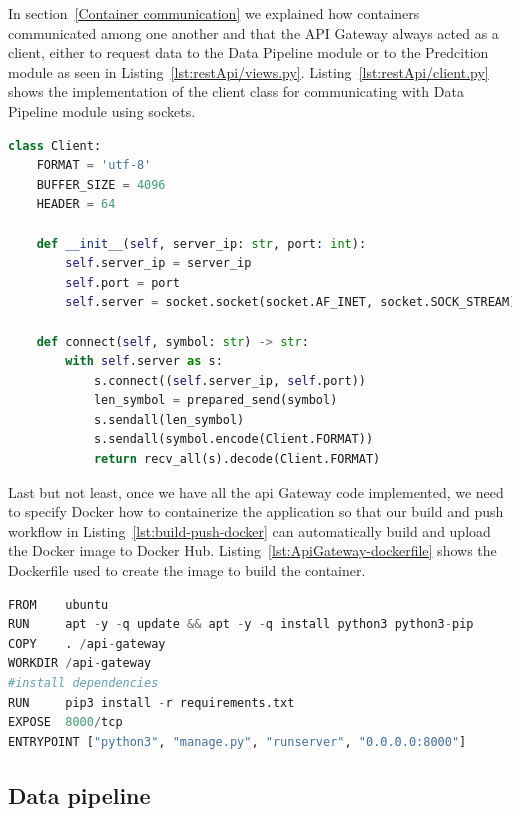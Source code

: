 In section~\ref{Container communication} we explained how containers communicated among one another and that the API Gateway always acted as a client, either to request data to the Data Pipeline module or to the Predcition module as seen in Listing~\ref{lst:restApi/views.py}. Listing~\ref{lst:restApi/client.py} shows the implementation of the client class for communicating with Data Pipeline module using sockets.

\begin{lstlisting}[language=python,caption=restApi/client.py,label={lst:restApi/client.py}]
class Client:
    FORMAT = 'utf-8'
    BUFFER_SIZE = 4096
    HEADER = 64

    def __init__(self, server_ip: str, port: int):
        self.server_ip = server_ip
        self.port = port
        self.server = socket.socket(socket.AF_INET, socket.SOCK_STREAM)

    def connect(self, symbol: str) -> str:
        with self.server as s:
            s.connect((self.server_ip, self.port))
            len_symbol = prepared_send(symbol)
            s.sendall(len_symbol)
            s.sendall(symbol.encode(Client.FORMAT))
            return recv_all(s).decode(Client.FORMAT)

\end{lstlisting}

Last but not least, once we have all the \gls{api} Gateway code implemented, we need to specify \gls{Docker} how to containerize the application so that our build and push workflow in Listing~\ref{lst:build-push-docker} can automatically build and upload the Docker image to Docker Hub. Listing~\ref{lst:ApiGateway-dockerfile} shows the Dockerfile used to create the image to build the container. 


\begin{lstlisting}[language=python,caption=Api Gateway Dockerfile,label={lst:ApiGateway-dockerfile}]
FROM    ubuntu
RUN     apt -y -q update && apt -y -q install python3 python3-pip
COPY    . /api-gateway 
WORKDIR /api-gateway
#install dependencies
RUN     pip3 install -r requirements.txt 
EXPOSE  8000/tcp
ENTRYPOINT ["python3", "manage.py", "runserver", "0.0.0.0:8000"] 
\end{lstlisting}

\subsection{Data pipeline}

